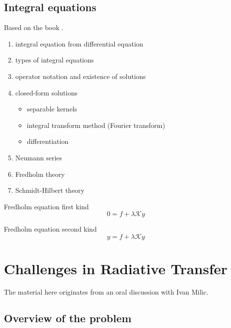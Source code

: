 \documentclass[../main/main.tex]{subfiles}
\begin{document}
\subsection{Integral equations}
Based on the book \cite{Mmfp}.
\begin{enumerate}
\item integral equation from differential equation
\item types of integral equations
\item operator notation and existence of solutions
\item closed-form solutions
\begin{itemize}
\item separable kernels
\item integral transform method (Fourier transform)
\item differentiation
\end{itemize}

\item Neumann series
\item Fredholm theory
\item Schmidt-Hilbert theory
\end{enumerate}

Fredholm equation first kind
\begin{equation}
0 = f + \lambda \mathcal{K}y
\end{equation}

Fredholm equation second kind
\begin{equation}
y = f + \lambda \mathcal{K}y
\end{equation}

\newpage
\section{Challenges in Radiative Transfer}
The material here originates from an oral discussion with Ivan Milic. 
\subsection{Overview of the problem}
\begin{center}
\end{center}
\end{document}
